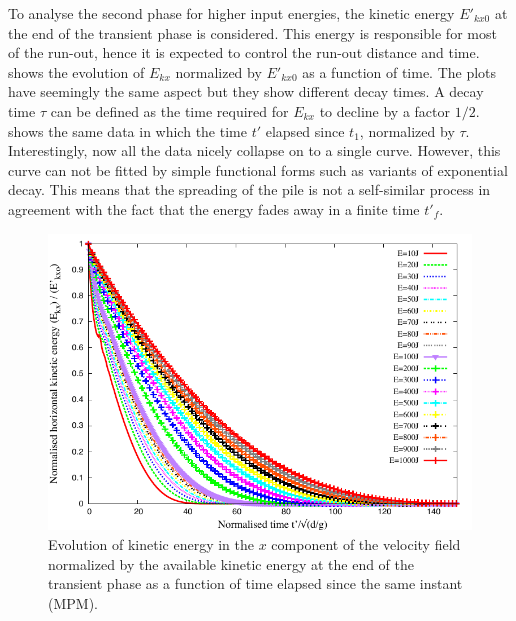 To analyse the second phase for higher input energies, the 
kinetic energy $E'_{kx0}$ at the end of the transient phase is 
considered. This energy is responsible for most of the run-out, hence it is 
expected to 
control the run-out distance and time.~ 
shows the evolution of $E_{kx}$ normalized by $E'_{kx0}$ as a function of time. 
The plots have seemingly the same aspect but they show different decay times. A 
decay time $\tau$ can be defined as the time required for $E_{kx}$ to decline 
by a factor $1/2$.~ shows the same data in 
which the time $t'$ elapsed since $t_1$, normalized by $\tau$. Interestingly, 
now all the data nicely collapse on to a single curve. However, this curve can 
not be fitted by simple functional forms such as variants of exponential decay. 
This means that the spreading of the pile is not a self-similar process in 
agreement with the fact that the energy fades away in a finite time $t'_f$. 

\clearpage

\begin{figure}[tbhp]
\centering
\includegraphics[width=\textwidth]{Normalised_KExExop_Slope}
\caption[Evolution of the normalised horizontal kinetic energy as function of 
time since the transient phase]{Evolution of kinetic energy in the $x$ 
component of the velocity field normalized by the available kinetic energy at 
the
end of the transient phase as a function of time elapsed since the
same instant (MPM).}
\label{fig:Normalised_KExExop_Slope}
\end{figure}

